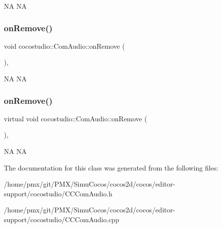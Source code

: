NA  NA \mbox{\label{classcocostudio_1_1ComAudio_a58b90fe44642cc06909fee2bc0b23f59}} 
\subsubsection{\texorpdfstring{on\+Remove()}{onRemove()}\hspace{0.1cm}{\footnotesize\ttfamily [1/2]}}
{\footnotesize\ttfamily void cocostudio\+::\+Com\+Audio\+::on\+Remove (\begin{DoxyParamCaption}{ }\end{DoxyParamCaption})\hspace{0.3cm}{\ttfamily [override]}, {\ttfamily [virtual]}}

NA  NA \mbox{\label{classcocostudio_1_1ComAudio_afd3abbe481d2b98e6b9aee9299d38c5c}} 
\subsubsection{\texorpdfstring{on\+Remove()}{onRemove()}\hspace{0.1cm}{\footnotesize\ttfamily [2/2]}}
{\footnotesize\ttfamily virtual void cocostudio\+::\+Com\+Audio\+::on\+Remove (\begin{DoxyParamCaption}{ }\end{DoxyParamCaption})\hspace{0.3cm}{\ttfamily [override]}, {\ttfamily [virtual]}}

NA  NA 

The documentation for this class was generated from the following files\+:\begin{DoxyCompactItemize}
\item 
/home/pmx/git/\+P\+M\+X/\+Simu\+Cocos/cocos2d/cocos/editor-\/support/cocostudio/C\+C\+Com\+Audio.\+h\item 
/home/pmx/git/\+P\+M\+X/\+Simu\+Cocos/cocos2d/cocos/editor-\/support/cocostudio/C\+C\+Com\+Audio.\+cpp\end{DoxyCompactItemize}
